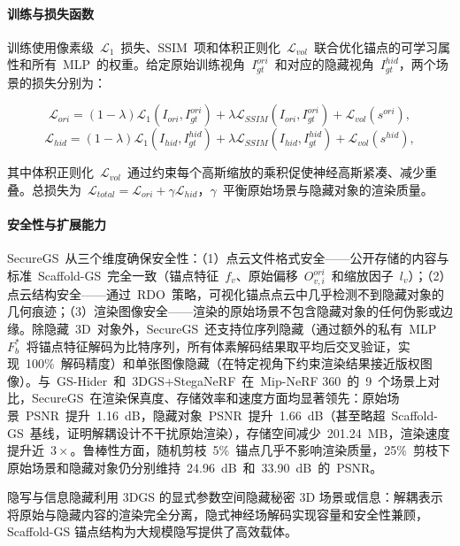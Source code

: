\paragraph{训练与损失函数}训练使用像素级~$\mathcal{L}_1$~损失、SSIM~项和体积正则化~$\mathcal{L}_{vol}$~联合优化锚点的可学习属性和所有~MLP~的权重。给定原始训练视角~$I_{gt}^{ori}$~和对应的隐藏视角~$I_{gt}^{hid}$，两个场景的损失分别为：

\begin{equation}
    \mathcal{L}_{ori} = (1-\lambda)\mathcal{L}_1(I_{ori}, I_{gt}^{ori}) + \lambda\mathcal{L}_{SSIM}(I_{ori}, I_{gt}^{ori}) + \mathcal{L}_{vol}(s^{ori}),
\end{equation}
\begin{equation}
    \mathcal{L}_{hid} = (1-\lambda)\mathcal{L}_1(I_{hid}, I_{gt}^{hid}) + \lambda\mathcal{L}_{SSIM}(I_{hid}, I_{gt}^{hid}) + \mathcal{L}_{vol}(s^{hid}),
\end{equation}

其中体积正则化~$\mathcal{L}_{vol}$~通过约束每个高斯缩放的乘积促使神经高斯紧凑、减少重叠。总损失为~$\mathcal{L}_{total} = \mathcal{L}_{ori} + \gamma \mathcal{L}_{hid}$，$\gamma$~平衡原始场景与隐藏对象的渲染质量。

\paragraph{安全性与扩展能力}SecureGS~从三个维度确保安全性：（1）点云文件格式安全——公开存储的内容与标准~Scaffold-GS~完全一致（锚点特征~$f_v$、原始偏移~$O_{v,i}^{ori}$~和缩放因子~$l_v$）；（2）点云结构安全——通过~RDO~策略，可视化锚点点云中几乎检测不到隐藏对象的几何痕迹；（3）渲染图像安全——渲染的原始场景不包含隐藏对象的任何伪影或边缘。除隐藏~3D~对象外，SecureGS~还支持位序列隐藏（通过额外的私有~MLP~$F_b^*$~将锚点特征解码为比特序列，所有体素解码结果取平均后交叉验证，实现~100\%~解码精度）和单张图像隐藏（在特定视角下约束渲染结果接近版权图像）。与~GS-Hider~和~3DGS+StegaNeRF~在~Mip-NeRF 360~的~9~个场景上对比，SecureGS~在渲染保真度、存储效率和速度方面均显著领先：原始场景~PSNR~提升~1.16~dB，隐藏对象~PSNR~提升~1.66~dB（甚至略超~Scaffold-GS~基线，证明解耦设计不干扰原始渲染），存储空间减少~201.24~MB，渲染速度提升近~$3\times$。鲁棒性方面，随机剪枝~5\%~锚点几乎不影响渲染质量，25\%~剪枝下原始场景和隐藏对象仍分别维持~24.96~dB~和~33.90~dB~的~PSNR。

\begin{takeaway}
隐写与信息隐藏利用 3DGS 的显式参数空间隐藏秘密 3D 场景或信息：解耦表示将原始与隐藏内容的渲染完全分离，隐式神经场解码实现容量和安全性兼顾，Scaffold-GS 锚点结构为大规模隐写提供了高效载体。
\end{takeaway}

